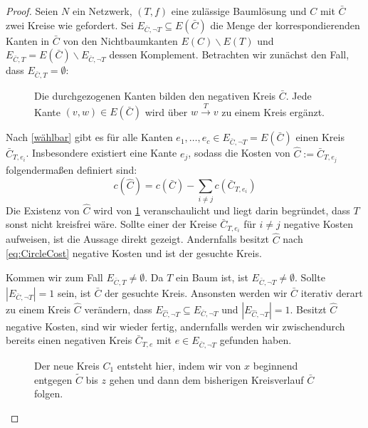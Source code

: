 \documentclass[a4paper,twoside,ngerman]{report}
\theoremstyle{plain}
\theoremstyle{definition}
\begin{document}
\begin{proof}Seien $N$ ein Netzwerk, $(T,f)$ eine zulässige Baumlösung und $C$ mit $\bar{C}$ zwei Kreise wie gefordert. Sei $E_{\bar{C},\neg T}\subseteq E(\bar{C})$ die Menge der korrespondierenden Kanten in $\bar{C}$ von den Nichtbaumkanten $E(C)\backslash E(T)$ und $E_{\bar{C},T}=E(\bar{C})\backslash E_{\bar{C},\neg T}$ dessen Komplement. Betrachten wir zunächst den Fall, dass $E_{\bar{C},T}=\emptyset$:

\begin{figure}[!ht]\centering
	
	\caption{Die durchgezogenen Kanten bilden den negativen Kreis $\bar{C}$. Jede Kante $(v,w)\in E(\bar{C})$ wird über $w\xrightarrow{T}v$ zu einem Kreis ergänzt.}
	\label{fig:NTC}
\end{figure}

Nach \cref{wählbar} gibt es für alle Kanten $e_1,\ldots,e_c\in E_{\bar{C},\neg T}=E(\bar{C})$ einen Kreis $\bar{C}_{T,e_i}$. Insbesondere existiert eine Kante $e_j$, sodass die Kosten von $\hat{C}:=\bar{C}_{T,e_j}$ folgendermaßen definiert sind:
\begin{equation}\label{eq:CircleCost}
c(\hat{C})=c(\bar{C})-\sum_{i\neq j} c(\bar{C}_{T,e_i})
\end{equation}
Die Existenz von $\hat{C}$ wird von \cref{fig:NTC} veranschaulicht und liegt darin begründet, dass $T$ sonst nicht kreisfrei wäre. Sollte einer der Kreise $\bar{C}_{T,e_i}$ für $i\neq j$ negative Kosten aufweisen, ist die Aussage direkt gezeigt. Andernfalls besitzt $\hat{C}$ nach \cref{eq:CircleCost} negative Kosten und ist der gesuchte Kreis.

Kommen wir zum Fall $E_{\bar{C},T}\neq\emptyset$. Da $T$ ein Baum ist, ist $E_{\bar{C},\neg T}\neq\emptyset$. Sollte $|E_{\bar{C},\neg T}|=1$ sein, ist $\bar{C}$ der gesuchte Kreis. Ansonsten werden wir $\bar{C}$ iterativ derart zu einem Kreis $\hat{C}$ verändern, dass $E_{\hat{C},\neg T}\subseteq E_{\bar{C},\neg T}$ und $|E_{\hat{C},\neg T}|=1$. Besitzt $\hat{C}$ negative Kosten, sind wir wieder fertig, andernfalls werden wir zwischendurch bereits einen negativen Kreis $\bar{C}_{T,e}$ mit $e\in E_{\bar{C},\neg T}$ gefunden haben.

\begin{figure}[!ht]\centering
	
	\caption{Der neue Kreis $C_1$ entsteht hier, indem wir von $x$ beginnend entgegen $\tilde{C}$ bis $z$ gehen und dann dem bisherigen Kreisverlauf $\bar{C}$ folgen.}
	\label{fig:TC}
\end{figure}


\end{proof}
\end{document}
